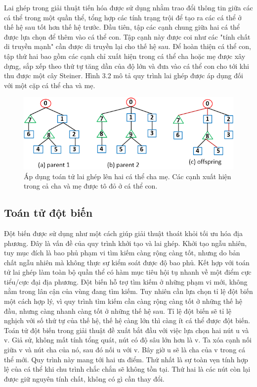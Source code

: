 \documentclass{hust}
\begin{document}
Lai ghép trong giải thuật tiến hóa được sử dụng nhằm trao đổi thông tin giữa các cá thể trong một quần thể, tổng hợp các tính trạng trội để tạo ra các cá thể ở thế hệ sau tốt hơn thế hệ trước. Đầu tiên, tập các cạnh chung giữa hai cá thể được lựa chọn để thêm vào cá thể con. Tập cạnh này được coi như các "tính chất di truyền mạnh" cần được di truyền lại cho thế hệ sau. Để hoàn thiện cá thể con, tập thứ hai bao gồm các cạnh chỉ xuất hiện trong cá thể cha hoặc mẹ được xây dựng, sắp xếp theo thứ tự tăng dần của độ lớn và đưa vào cá thể con cho tới khi thu được một cây Steiner. Hình 3.2 mô tả quy trình lai ghép được áp dụng đối với một cặp cá thể cha và mẹ.

\begin{figure}[hpt]
	\includegraphics[scale=1.0]{images/crossover.png}
	\caption{Áp dụng toán tử lai ghép lên hai cá thể cha mẹ. Các cạnh xuất hiện trong cả cha và mẹ được tô đỏ ở cá thể con.} \label{fig:cross}
\end{figure}

\subsection{Toán tử đột biến} \label{mutation}

Đột biến được sử dụng như một cách giúp giải thuật thoát khỏi tối ưu hóa địa phương. Đây là vấn đề của quy trình khởi tạo và lai ghép. Khởi tạo ngẫu nhiên, tuy mục đích là bao phủ phạm vi tìm kiếm càng rộng càng tốt, nhưng do bản chất ngẫu nhiên mà không thực sự kiểm soát được độ bao phủ. Kết hợp với toán tử lai ghép làm toàn bộ quần thể có hàm mục tiêu hội tụ nhanh về một điểm cực tiểu/cực đại địa phương.
Đột biến hỗ trợ tìm kiếm ở những phạm vi mới, không nằm trong lân cận của vùng đang tìm kiếm. Tuy nhiên cần lựa chọn tỉ lệ đột biến một cách hợp lý, vì quy trình tìm kiếm cần càng rộng càng tốt ở những thế hệ đầu, nhưng càng nhanh càng tốt ở những thế hệ sau. Tỉ lệ đột biến sẽ tỉ lệ nghịch với số thứ tự của thế hệ, thế hệ càng lớn thì càng ít cá thể được đột biến.
Toán tử đột biến trong giải thuật đề xuất bắt đầu với việc lựa chọn hai nút u và v. Giả sử, không mất tính tổng quát, nút có độ sâu lớn hơn là v. Ta xóa cạnh nối giữa v và nút cha của nó, sau đó nối u với v. Bây giờ u sẽ là cha của v trong cá thể mới. Quy trình này mang tới hai ưa điểm. Thứ nhất là sự toàn vẹn tính hợp lệ của cá thể khi chu trình chắc chắn sẽ không tồn tại. Thứ hai là các nút còn lại được giữ nguyên tính chất, không có gì cần thay đổi.
\end{document}
